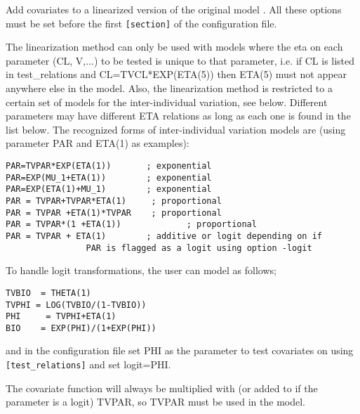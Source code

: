 Add covariates to a linearized version of the  original model \cite{Khandelwal}. All these options must be set before the first \verb|[section]| of the configuration file. 

The linearization method can only be used with models where the eta on each parameter (CL, V,...) to be tested is unique to that parameter, i.e. if  CL is listed in test\_relations and CL=TVCL*EXP(ETA(5)) then ETA(5) must not appear anywhere else in the model. Also, the linearization method is restricted to a certain set of models for the inter-individual variation, see below. Different parameters may have different ETA relations as long as each one is found in the list below.
The recognized forms of inter-individual variation models are (using parameter PAR and ETA(1) as  examples):
\begin{verbatim}
PAR=TVPAR*EXP(ETA(1))	   	; exponential
PAR=EXP(MU_1+ETA(1))     	; exponential
PAR=EXP(ETA(1)+MU_1)    	; exponential
PAR = TVPAR+TVPAR*ETA(1)     ; proportional
PAR = TVPAR +ETA(1)*TVPAR    ; proportional
PAR = TVPAR*(1 +ETA(1))          	; proportional
PAR = TVPAR + ETA(1)   	 	; additive or logit depending on if 
                PAR is flagged as a logit using option -logit
\end{verbatim}
To handle logit transformations, the user can model as follows;
\begin{verbatim}
TVBIO  = THETA(1)
TVPHI = LOG(TVBIO/(1-TVBIO))
PHI     = TVPHI+ETA(1)	
BIO    = EXP(PHI)/(1+EXP(PHI))
\end{verbatim}
and in the configuration file set PHI as the parameter to test covariates on using \verb|[test_relations]| and set logit=PHI.

The covariate function will always be multiplied with (or added to if the parameter is a logit) TVPAR, so TVPAR must be used in the model.

